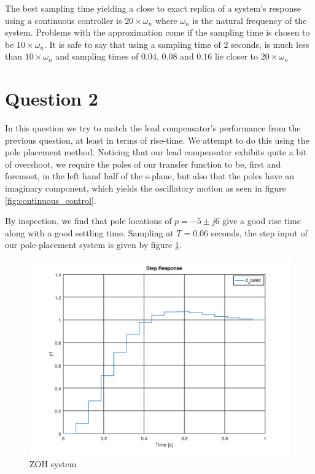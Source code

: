\documentclass[a4paper, 12pt]{article}
\begin{document}
The best sampling time yielding a close to exact replica of a system's response
using a continuous controller is $20\times \omega_n$ where $\omega_n$ is the
natural frequency of the system. Problems with the approximation come if the
sampling time is chosen to be $10\times \omega_n$. It is safe to say that using
a sampling time of $2$ seconds, is much less than $10\times \omega_n$ and
sampling times of $0.04$, $0.08$ and $0.16$ lie closer to $20\times \omega_n$





\section{Question 2}

In this question we try to match the lead compensator's performance from the
previous question, at least in terms of rise-time. We attempt to do this using
the pole placement method. Noticing that our lead compensator exhibits quite a
bit of overshoot, we require the poles of our transfer function to be, first
and foremost, in the left hand half of the s-plane, but also that the poles
have an imaginary component, which yields the oscillatory motion as seen in
figure \ref{fig:continuous_control}.

By inspection, we find that pole locations of $p = -5 \pm j6$ give a good rise
time along with a good settling time. Sampling at $T = 0.06$ seconds, the step
input of our pole-placement system is given by figure \ref{fig:2_1}.

\begin{figure}[H]
	\centering
	\includegraphics[width=\textwidth]{./img/2_1.png}
	\caption{ZOH system}
	\label{fig:2_1}
\end{figure}
\end{document}
